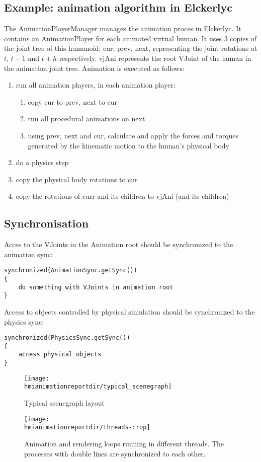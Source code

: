 \subsection{Example: animation algorithm in Elckerlyc}
The AnimationPlayerManager manages the animation proces in Elckerlyc. It contains an AnimationPlayer for each animated virtual human. It uses 3 copies of the joint tree of this humanoid: cur, prev, next, representing the joint rotations at $t$, $t-1$ and $t+h$ respectively. vjAni represents the root VJoint of the human in the animation joint tree. Animation is executed as follows:
\begin{enumerate}
\item run all animation players, in each animation player:
\begin{enumerate}
\item copy cur to prev, next to cur
\item run all procedural animations on next 
\item using prev, next and cur, calculate and apply the forces and torques generated by the kinematic motion to the human's physical body
\end{enumerate}
\item do a physics step
\item copy the physical body rotations to cur
\item copy the rotations of curr and its children to vjAni (and its children)
\end{enumerate}

\subsection{Synchronisation}
Acces to the VJoints in the Animation root should be synchronized to the animation sync:
\begin{verbatim}
synchronized(AnimationSync.getSync())
{
	do something with VJoints in animation root
}
\end{verbatim}
Access to objects controlled by physical simulation should be synchronized to the physics sync:
\begin{verbatim}
synchronized(PhysicsSync.getSync())
{
	access physical objects
}
\end{verbatim}

\begin{figure}
\texttt{[image: \\hmianimationreportdir/typical\_scenegraph]}
\caption{\label{figuresg}Typical scenegraph layout}
\end{figure}

\begin{figure}
\texttt{[image: \\hmianimationreportdir/threads-crop]}
\caption{\label{threads}Animation and rendering loops running in different threads. The processes with double lines are synchronized to each other.}
\end{figure}


